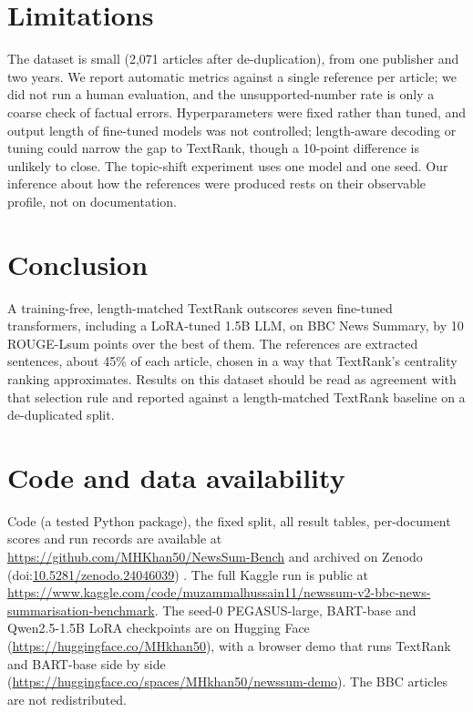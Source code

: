 \documentclass[11pt,a4paper]{article}
\begin{document}
\section{Limitations}
The dataset is small (2,071 articles after de-duplication), from one publisher and two years. We report automatic metrics against a single reference per article; we did not run a human evaluation, and the unsupported-number rate is only a coarse check of factual errors. Hyperparameters were fixed rather than tuned, and output length of fine-tuned models was not controlled; length-aware decoding or tuning could narrow the gap to TextRank, though a 10-point difference is unlikely to close. The topic-shift experiment uses one model and one seed. Our inference about how the references were produced rests on their observable profile, not on documentation.

\section{Conclusion}
A training-free, length-matched TextRank outscores seven fine-tuned transformers, including a LoRA-tuned 1.5B LLM, on BBC News Summary, by 10 ROUGE-Lsum points over the best of them. The references are extracted sentences, about 45\% of each article, chosen in a way that TextRank's centrality ranking approximates. Results on this dataset should be read as agreement with that selection rule and reported against a length-matched TextRank baseline on a de-duplicated split.

\section*{Code and data availability}
Code (a tested Python package), the fixed split, all result tables, per-document scores and run records are available at \url{https://github.com/MHKhan50/NewsSum-Bench} and archived on Zenodo (doi:\href{https://doi.org/10.5281/zenodo.24046039}{10.5281/zenodo.24046039}) \cite{hussain2026newssum}. The full Kaggle run is public at \url{https://www.kaggle.com/code/muzammalhussain11/newssum-v2-bbc-news-summarisation-benchmark}. The seed-0 PEGASUS-large, BART-base and Qwen2.5-1.5B LoRA checkpoints are on Hugging Face (\url{https://huggingface.co/MHkhan50}), with a browser demo that runs TextRank and BART-base side by side (\url{https://huggingface.co/spaces/MHkhan50/newssum-demo}). The BBC articles are not redistributed.



\end{document}
